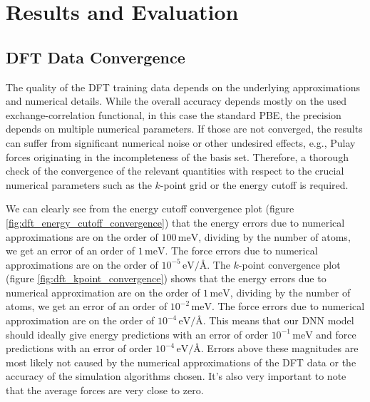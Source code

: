 \chapter{Results and Evaluation}
\label{chap:results-and-evaluation}

\section{DFT Data Convergence}

The quality of the DFT training data depends on the underlying approximations
and numerical details. While the overall accuracy depends mostly on the used
exchange-correlation functional, in this case the standard PBE, the precision
depends on multiple numerical parameters. If those are not converged, the
results can suffer from significant numerical noise or other undesired
effects, e.g., Pulay forces originating in the incompleteness of the basis
set. Therefore, a thorough check of the convergence of the relevant quantities
with respect to the crucial numerical parameters such as the $k$-point grid or
the energy cutoff is required.

We can clearly see from the energy cutoff convergence plot
(figure \ref{fig:dft_energy_cutoff_convergence}) that the energy errors due
to numerical approximations are on the order of $100 \, \mathrm{meV}$,
dividing by the number of atoms, we get an error of an order of
$1 \, \mathrm{meV}$. The force errors due to numerical approximations are on
the order of $10^{-5} \, \mathrm{eV}/\text{\AA}$. The $k$-point convergence
plot (figure \ref{fig:dft_kpoint_convergence}) shows that the energy errors
due to numerical approximation are on the order of $1 \, \mathrm{meV}$,
dividing by the number of atoms, we get an error of an order of
$10^{-2} \, \mathrm{meV}$. The force errors due to numerical approximation are
on the order of $10^{-4} \, \mathrm{eV}/\text{\AA}$. This means that our DNN
model should ideally give energy predictions with an error of order
$10^{-1} \, \mathrm{meV}$ and force predictions with an error of order
$10^{-4} \, \mathrm{eV}/\text{\AA}$. Errors above these magnitudes are
most likely not caused by the numerical approximations of the DFT data or the
accuracy of the simulation algorithms chosen. It's also very important to note
that the average forces are very close to zero.

